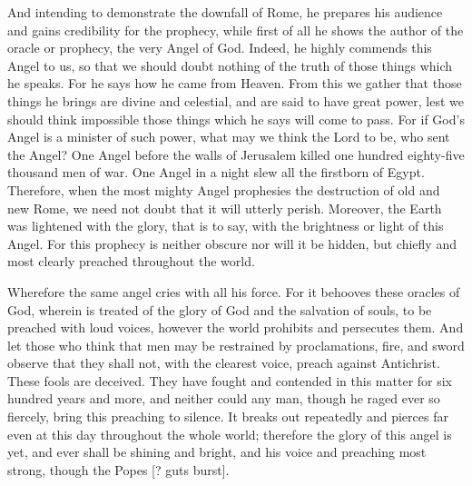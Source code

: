 And intending to demonstrate the downfall of Rome, he prepares his audience and gains credibility for the prophecy, while first of all he shows the author of the oracle or prophecy, the very Angel of God. Indeed, he highly commends this Angel to us, so that we should doubt nothing of the truth of those things which he speaks. For he says how he came from Heaven. From this we gather that those things he brings are divine and celestial, and are said to have great power, lest we should think impossible those things which he says will come to pass. For if God’s Angel is a minister of such power, what may we think the Lord to be, who sent the Angel? One Angel before the walls of Jerusalem killed one hundred eighty-five thousand men of war. One Angel in a night slew all the firstborn of Egypt. Therefore, when the most mighty Angel prophesies the destruction of old and new Rome, we need not doubt that it will utterly perish. Moreover, the Earth was lightened with the glory, that is to say, with the brightness or light of this Angel. For this prophecy is neither obscure nor will it be hidden, but chiefly and most clearly preached throughout the world.

Wherefore the same angel cries with all his force. For it behooves these oracles of God, wherein is treated of the glory of God and the salvation of souls, to be preached with loud voices, however the world prohibits and persecutes them. And let those who think that men may be restrained by proclamations, fire, and sword observe that they shall not, with the clearest voice, preach against Antichrist. These fools are deceived. They have fought and contended in this matter for six hundred years and more, and neither could any man, though he raged ever so fiercely, bring this preaching to silence. It breaks out repeatedly and pierces far even at this day throughout the whole world; therefore the glory of this angel is yet, and ever shall be shining and bright, and his voice and preaching most strong, though the Popes [? guts burst].

